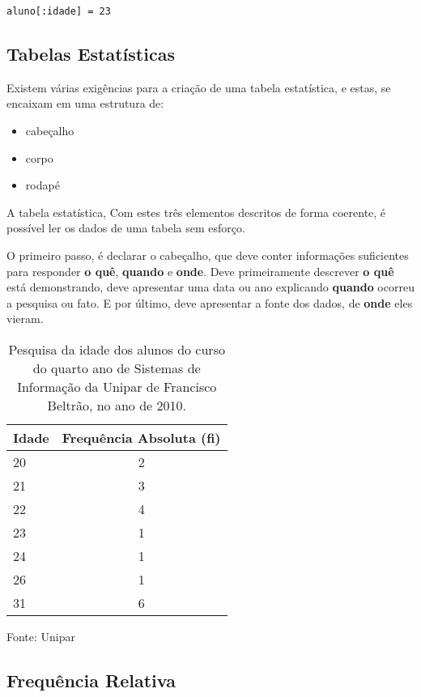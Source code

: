 \documentclass[12pt]{article}
\newcommand{\code}[1] {\textbf{#1}}
\begin{document}
\begin{lstlisting}[caption=Atribuindo o valor 23 para a chave :idade da variável aluno]
aluno[:idade] = 23 
\end{lstlisting}

\subsection { Tabelas Estatísticas }

Existem várias exigências para a criação de uma tabela estatística, e estas, se encaixam em uma estrutura de:


\begin{itemize} 
  \item{cabeçalho}
  \item{corpo}
  \item{rodapé}
\end{itemize} 

A tabela estatística, Com estes três elementos descritos de forma coerente, é possível ler os dados de uma tabela sem esforço. 

O primeiro passo, é declarar o cabeçalho, que deve conter informações suficientes para responder \code{o quê}, \textbf{quando} e \textbf{onde}. Deve primeiramente descrever \textbf{o quê} está demonstrando, deve apresentar uma data ou ano explicando \textbf{quando} ocorreu a pesquisa ou fato. E por último, deve apresentar a fonte dos dados, de \textbf{onde} eles vieram.

\begin{table}
\caption{Pesquisa da idade dos alunos do curso do quarto ano de Sistemas de Informação da Unipar de Francisco Beltrão, no ano de 2010.}
\begin{tabular}{|l|c|} 
\hline 
Idade & Frequência Absoluta (\code{fi}) \\ \hline 
20 & 2 \\
21 & 3 \\
22 & 4 \\
23 & 1 \\
24 & 1 \\
26 & 1 \\
31 & 6 \\ 
\hline 
\end{tabular}
\small{Fonte: Unipar}
\end{table}

\subsection { Frequência Relativa }
\end{document}
